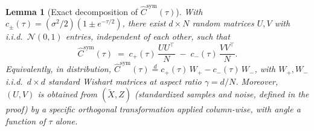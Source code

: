 \documentclass[10pt,a4paper]{amsart}
\newtheorem{lemma}{Lemma}
\begin{document}
\begin{lemma}[Exact decomposition of $\hat C^{\mathrm{sym}}(\tau)$]
\label{lem:decomp}
With $c_\pm(\tau) = (\sigma^2/2)(1 \pm e^{-\tau/2})$, there exist
$d\times N$ random matrices $U, V$ with i.i.d.\ $\mathcal N(0,1)$
entries, independent of each other, such that
\begin{equation}
\hat C^{\mathrm{sym}}(\tau) \;=\; c_+(\tau)\,\frac{UU^\top}{N} \;-\; c_-(\tau)\,\frac{VV^\top}{N}.
\label{eq:wishart-decomp}
\end{equation}
Equivalently, in distribution, $\hat C^{\mathrm{sym}}(\tau) \stackrel{d}{=} c_+(\tau)\,W_+ - c_-(\tau)\,W_-$,
with $W_+,W_-$ i.i.d.\ $d\times d$ standard Wishart matrices at aspect
ratio $\gamma = d/N$. Moreover, $(U, V)$ is obtained from $(\tilde X, Z)$
(standardized samples and noise, defined in the proof) by a specific
orthogonal transformation applied column-wise, with angle a function of
$\tau$ alone.
\end{lemma}
\end{document}
